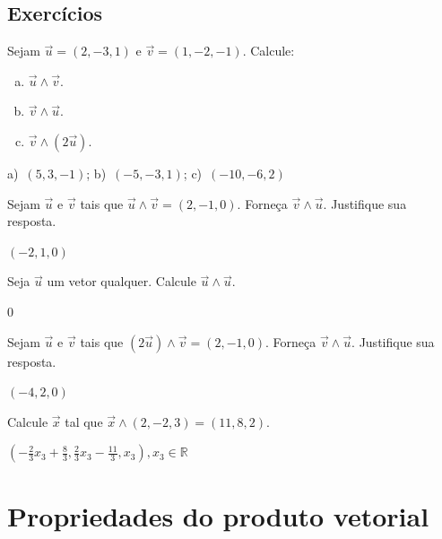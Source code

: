 \subsection*{Exercícios}

\begin{exer}
  Sejam $\vec{u}=(2,-3,1)$ e $\vec{v}=(1,-2,-1)$. Calcule:
  \begin{enumerate}[a)]
  \item $\vec{u}\land\vec{v}$.
  \item $\vec{v}\land\vec{u}$.
  \item $\vec{v}\land(2\vec{u})$.
  \end{enumerate}
\end{exer}
\begin{resp}
  a)~$(5,3,-1)$; b)~$(-5,-3,1)$; c)~$(-10,-6,2)$
\end{resp}

\begin{exer}
  Sejam $\vec{u}$ e $\vec{v}$ tais que $\vec{u}\land\vec{v}=(2,-1,0)$. Forneça $\vec{v}\land\vec{u}$. Justifique sua resposta.
\end{exer}
\begin{resp}
  $(-2,1,0)$
\end{resp}

\begin{exer}
  Seja $\vec{u}$ um vetor qualquer. Calcule $\vec{u}\land\vec{u}$.
\end{exer}
\begin{resp}
  $0$
\end{resp}

\begin{exer}
  Sejam $\vec{u}$ e $\vec{v}$ tais que $(2\vec{u})\land\vec{v}=(2,-1,0)$. Forneça $\vec{v}\land\vec{u}$. Justifique sua resposta.
\end{exer}
\begin{resp}
  $(-4,2,0)$
\end{resp}

\begin{exer}
  Calcule $\vec{x}$ tal que $\vec{x}\land (2,-2,3)=(11,8,2)$.
\end{exer}
\begin{resp}
  $\left(-\frac{2}{3}x_3+\frac{8}{3},\frac{2}{3}x_3-\frac{11}{3},x_3\right), x_3\in\mathbb{R}$
\end{resp}

\section{Propriedades do produto vetorial}\label{cap_prodvet_sec_prop}

